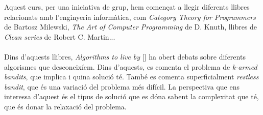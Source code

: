 
		Aquest curs, per una iniciativa de grup, hem començat a llegir diferents llibres relacionats amb l'enginyeria informàtica, com 
		\textit{Category Theory for Programmers} de Bartosz Milewski, \textit{The Art of Computer Programming}  de D. Knuth, llibres
		de \textit{Clean series} de Robert C. Martin...\\
		\\
		Dins d'aquests llibres, \textit{Algorithms to live by} [] %
		ha obert debats sobre diferents algorismes que desconeixíem. Dins d'aquests, es comenta el problema de
		\textit{k-armed bandits}, que implica i quina solució té. També es comenta superficialment \textit{restless bandit},
		que és una variació del problema més difícil. La perspectiva que ens interessa d'aquest és el tipus de solució
		que es dóna sabent la complexitat que té, que és donar la relaxació del problema.  %
